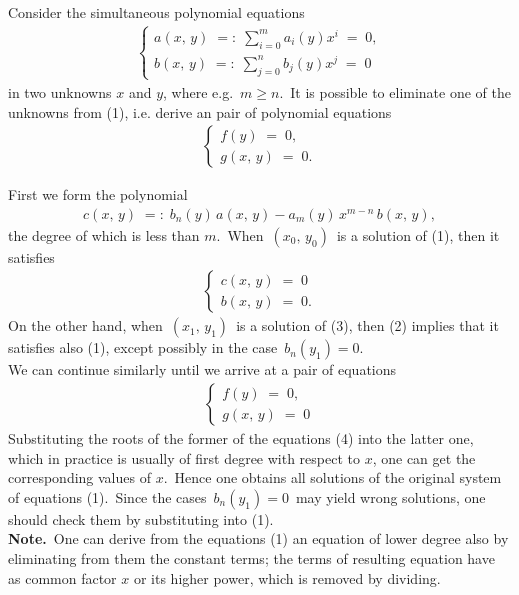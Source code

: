 \documentclass[12pt]{article}
\theoremstyle{definition}
\begin{document}
Consider the simultaneous polynomial equations
\begin{align}
\begin{cases}
a(x,\,y) \;=:\; \sum_{i=0}^ma_i(y)x^i \;=\; 0,\\
b(x,\,y) \;=:\; \sum_{j=0}^nb_j(y)x^j \;=\; 0
\end{cases}
\end{align}
in two unknowns $x$ and $y$, where e.g.\, $m \ge n$.\, It is possible to eliminate one of the unknowns from (1), i.e. derive an  pair of polynomial equations
\begin{align*}
\begin{cases}
f(y) \;=\; 0,\\
g(x,\,y) \;=\; 0.
\end{cases}
\end{align*}

First we form the polynomial
\begin{align}
c(x,\,y) \;=:\; b_n(y)\,a(x,\,y)-a_m(y)\,x^{m-n}\,b(x,\,y),
\end{align}
the degree of which is less than $m$.\, When\, $(x_0,\,y_0)$\, is a solution of (1), then it satisfies 
\begin{align}
\begin{cases}
c(x,\,y) \;=\; 0\\
b(x,\,y) \;=\; 0.
\end{cases}
\end{align}
On the other hand, when\, $(x_1,\,y_1)$\, is a solution of (3), then (2) implies that it satisfies also (1), except possibly in the case\, $b_n(y_1) = 0$.\\
We can continue similarly until we arrive at a pair of equations
\begin{align}
\begin{cases}
f(y) \;=\; 0,\\
g(x,\,y) \;=\; 0
\end{cases}
\end{align}
Substituting the roots of the former of the equations (4) into the latter one, which in practice is usually of first degree with respect to $x$, one can get the corresponding values of $x$.\, Hence one obtains all solutions of the original system of equations (1).\, Since the cases\, $b_n(y_1) = 0$\, may yield wrong solutions, one should check them by substituting into (1).\\

\textbf{Note.}\, One can derive from the equations (1) an equation of lower degree also by eliminating from them the constant terms; the terms of resulting equation have as common factor $x$ or its higher power, which is removed by dividing.


\end{document}
